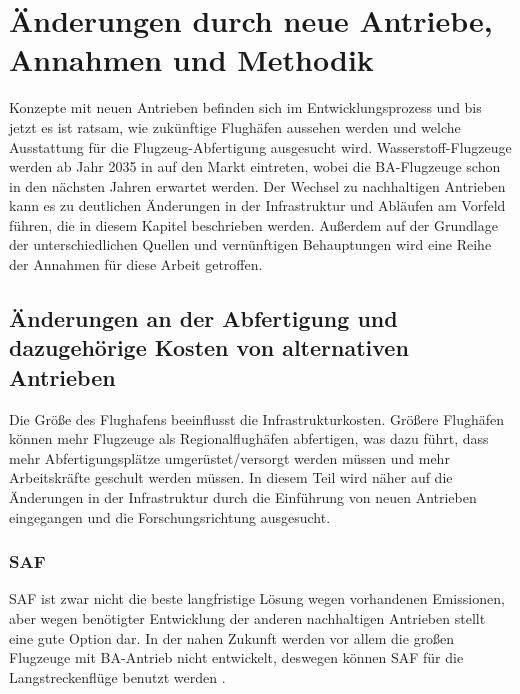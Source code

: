 \chapter{Änderungen durch neue Antriebe, Annahmen und Methodik}
\label{ch:Änderungen durch neue Antriebe, Annahmen und Methodik}

Konzepte mit neuen Antrieben befinden sich im Entwicklungsprozess und bis jetzt es ist ratsam, wie zukünftige Flughäfen aussehen werden
und welche Ausstattung für die Flugzeug-Abfertigung ausgesucht wird. Wasserstoff-Flugzeuge werden ab Jahr 2035 in 
auf den Markt eintreten, wobei die BA-Flugzeuge schon in den nächsten Jahren erwartet werden.
Der Wechsel zu nachhaltigen Antrieben kann es zu deutlichen Änderungen in der Infrastruktur und Abläufen am Vorfeld führen, die
in diesem Kapitel beschrieben werden.
Außerdem auf der Grundlage der unterschiedlichen Quellen und vernünftigen Behauptungen wird eine Reihe der Annahmen für diese Arbeit getroffen.
%

\section{Änderungen an der Abfertigung und dazugehörige Kosten von alternativen Antrieben}
\label{s:Änderungen an der Abfertigung und dazugehörige Kosten von alternativen Antrieben}

Die Größe des Flughafens beeinflusst die Infrastrukturkosten. Größere Flughäfen können mehr Flugzeuge als Regionalflughäfen 
abfertigen, was dazu führt, dass mehr Abfertigungsplätze umgerüstet/versorgt werden müssen und mehr Arbeitskräfte geschult werden müssen. 
In diesem Teil wird näher auf die Änderungen in der Infrastruktur durch die Einführung von neuen Antrieben eingegangen und 
die Forschungsrichtung ausgesucht.

\subsection{SAF}
SAF ist zwar nicht die beste langfristige Lösung wegen vorhandenen Emissionen, aber wegen benötigter Entwicklung der anderen nachhaltigen
Antrieben stellt eine gute Option dar. In der nahen Zukunft werden vor allem die großen Flugzeuge mit BA-Antrieb nicht entwickelt, 
deswegen können SAF für die Langstreckenflüge benutzt werden \cite{dalmia2022powering}.

